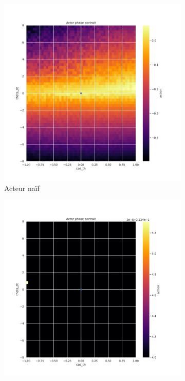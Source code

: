 \begin{figure}[H]
    \centering
    \begin{subfigure}{0.3\textwidth}
        \includegraphics[width=\textwidth]{figures/iteration2/0_actor_normalize__ante_Pendulum-v0.pdf}
        \caption{Acteur naïf}
    \end{subfigure}
    \begin{subfigure}{0.3\textwidth}
        \includegraphics[width=\textwidth]{figures/iteration2/0_actor_normalize__post_Pendulum-v0.pdf}

\end{subfigure}
\end{figure}
